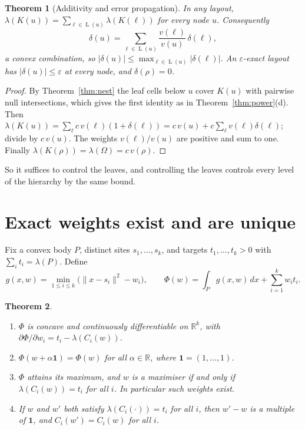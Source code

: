 \documentclass[11pt,a4paper]{article}
\theoremstyle{plain}
\newtheorem{theorem}{Theorem}
\theoremstyle{definition}
\theoremstyle{remark}
\newcommand{\R}{\mathbb{R}}
\newcommand{\area}{\lambda}
\newcommand{\norm}[1]{\lVert #1\rVert}
\newcommand{\leaves}{\operatorname{L}}
\begin{document}
\begin{theorem}[Additivity and error propagation]\label{thm:additive}
In any layout, $\area(K(u))=\sum_{\ell\in\leaves(u)}\area(K(\ell))$ for every
node $u$. Consequently
\[
  \delta(u)=\sum_{\ell\in\leaves(u)}\frac{v(\ell)}{v(u)}\,\delta(\ell),
\]
a convex combination, so $\lvert\delta(u)\rvert\le\max_{\ell\in\leaves(u)}\lvert\delta(\ell)\rvert$.
An $\varepsilon$-exact layout has $\lvert\delta(u)\rvert\le\varepsilon$ at
\emph{every} node, and $\delta(\rho)=0$.
\end{theorem}
\begin{proof}
By Theorem~\ref{thm:nest} the leaf cells below $u$ cover $K(u)$ with pairwise
null intersections, which gives the first identity as in
Theorem~\ref{thm:power}(d). Then
$\area(K(u))=\sum_\ell c\,v(\ell)(1+\delta(\ell))
 =c\,v(u)+c\sum_\ell v(\ell)\delta(\ell)$; divide by $c\,v(u)$. The weights
$v(\ell)/v(u)$ are positive and sum to one. Finally
$\area(K(\rho))=\area(\Omega)=c\,v(\rho)$.
\end{proof}

So it suffices to control the leaves, and controlling the leaves controls
every level of the hierarchy by the same bound.

\section{Exact weights exist and are unique}

Fix a convex body $P$, distinct sites $s_1,\dots,s_k$, and targets
$t_1,\dots,t_k>0$ with $\sum_i t_i=\area(P)$. Define
\[
  g(x,w)=\min_{1\le i\le k}\bigl(\norm{x-s_i}^2-w_i\bigr),\qquad
  \Phi(w)=\int_P g(x,w)\,dx+\sum_{i=1}^k w_i t_i .
\]

\begin{theorem}\label{thm:weights}
\begin{enumerate}[label=(\alph*)]
\item $\Phi$ is concave and continuously differentiable on $\R^k$, with
      $\partial\Phi/\partial w_i=t_i-\area(C_i(w))$.
\item $\Phi(w+\alpha\mathbf{1})=\Phi(w)$ for all $\alpha\in\R$, where
      $\mathbf 1=(1,\dots,1)$.
\item $\Phi$ attains its maximum, and $w$ is a maximiser if and only if
      $\area(C_i(w))=t_i$ for all $i$. In particular such weights exist.
\item If $w$ and $w'$ both satisfy $\area(C_i(\cdot))=t_i$ for all $i$, then
      $w'-w$ is a multiple of $\mathbf 1$, and $C_i(w')=C_i(w)$ for all $i$.
\end{enumerate}
\end{theorem}
\end{document}

